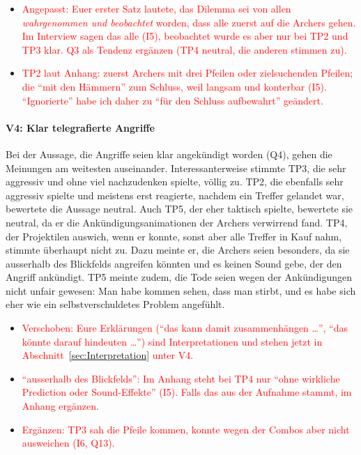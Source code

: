\documentclass[../Main.tex]{subfiles}
\begin{document}
\begin{itemize}[leftmargin=1.5cm]
    \item \textcolor{red}{Angepasst: Euer erster Satz lautete, das Dilemma sei von allen \emph{wahrgenommen und beobachtet} worden, dass alle zuerst auf die Archers gehen. Im Interview sagen das alle (I5), beobachtet wurde es aber nur bei TP2 und TP3 klar. Q3 als Tendenz ergänzen (TP4 neutral, die anderen stimmen zu).}
    \item \textcolor{red}{TP2 laut Anhang: zuerst Archers mit drei Pfeilen oder zielsuchenden Pfeilen; die \enquote{mit den Hämmern} zum Schluss, weil langsam und konterbar (I5). \enquote{Ignorierte} habe ich daher zu \enquote{für den Schluss aufbewahrt} geändert.}
\end{itemize}

\paragraph{V4: Klar telegrafierte Angriffe}
Bei der Aussage, die Angriffe seien klar angekündigt worden (Q4), gehen die Meinungen am weitesten auseinander. Interessanterweise stimmte TP3, die sehr aggressiv und ohne viel nachzudenken spielte, völlig zu. TP2, die ebenfalls sehr aggressiv spielte und meistens erst reagierte, nachdem ein Treffer gelandet war, bewertete die Aussage neutral. Auch TP5, der eher taktisch spielte, bewertete sie neutral, da er die Ankündigungsanimationen der Archers verwirrend fand. TP4, der Projektilen auswich, wenn er konnte, sonst aber alle Treffer in Kauf nahm, stimmte überhaupt nicht zu. Dazu meinte er, die Archers seien besonders, da sie ausserhalb des Blickfelds angreifen könnten und es keinen Sound gebe, der den Angriff ankündigt. TP5 meinte zudem, die Tode seien wegen der Ankündigungen nicht unfair gewesen: Man habe kommen sehen, dass man stirbt, und es habe sich eher wie ein selbstverschuldetes Problem angefühlt.

\begin{itemize}[leftmargin=1.5cm]
    \item \textcolor{red}{Verschoben: Eure Erklärungen (\enquote{das kann damit zusammenhängen \ldots}, \enquote{das könnte darauf hindeuten \ldots}) sind Interpretationen und stehen jetzt in Abschnitt~\ref{sec:Interpretation} unter V4.}
    \item \textcolor{red}{\enquote{ausserhalb des Blickfelds}: Im Anhang steht bei TP4 nur \enquote{ohne wirkliche Prediction oder Sound-Effekte} (I5). Falls das aus der Aufnahme stammt, im Anhang ergänzen.}
    \item \textcolor{red}{Ergänzen: TP3 sah die Pfeile kommen, konnte wegen der Combos aber nicht ausweichen (I6, Q13).}
\end{itemize}
\end{document}
